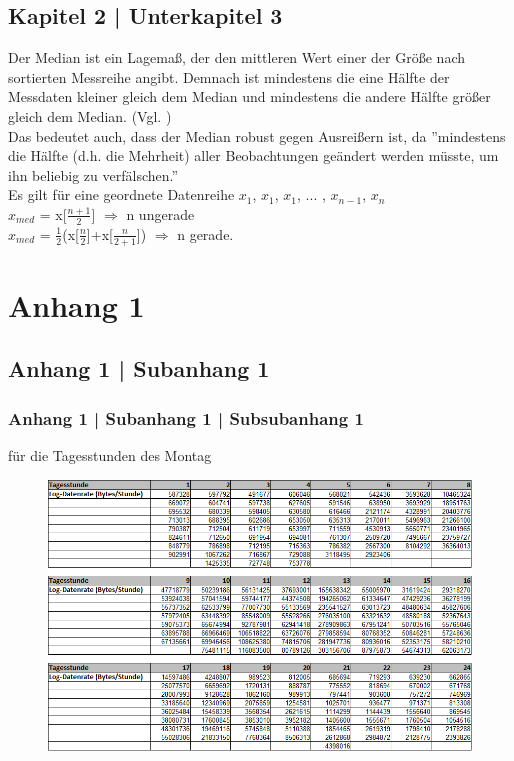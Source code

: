 \documentclass[deutsch]{lib/llncs/llncs}
\begin{document}
\subsection{Kapitel 2 | Unterkapitel 3}
Der Median ist ein Lagemaß, der den mittleren Wert einer der Größe nach sortierten Messreihe angibt. Demnach ist mindestens die eine Hälfte der Messdaten kleiner gleich dem Median und mindestens die andere Hälfte größer gleich dem Median. (Vgl. \cite[p. 23]{Zitat03})\\
Das bedeutet auch, dass der Median robust gegen Ausreißern ist, da ''mindestens die Hälfte (d.h. die Mehrheit) aller Beobachtungen geändert werden müsste, um ihn beliebig zu verfälschen.''\cite[p. 27]{Zitat03}\\
Es gilt für eine geordnete Datenreihe $x_{1}$, $x_{1}$, $x_{1}$, ... , $x_{n-1}$, $x_{n}$
\\
$x_{med}$ = x[$\frac{n+1}{2}$] $\Rightarrow$ n ungerade \\
$x_{med}$ = $\frac{1}{2}$(x[$\frac{n}{2}$]+x[$\frac{n}{2+1}$]) $\Rightarrow$ n gerade. 






\newpage
\appendix


\section{Anhang 1}


\subsection{Anhang 1 | Subanhang 1}


\subsubsection{Anhang 1 | Subanhang 1 | Subsubanhang 1} für die Tagesstunden des Montag
\begin{figure}[!htb]
	\centering
	\includegraphics[scale=0.65]{img/BoxplotMessdatenPic1.png}
\end{figure}
\newpage
\end{document}
